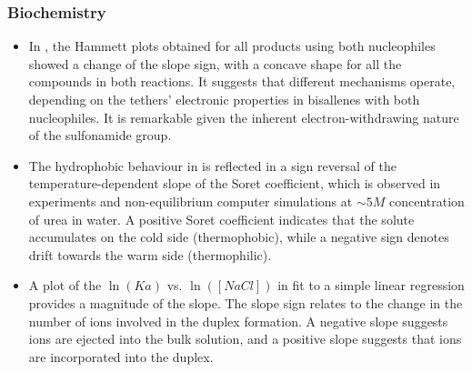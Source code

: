 \documentclass[11pt]{book}
\begin{document}
\subsubsection{Biochemistry}
\begin{itemize}
\item In \cite{quiros2017nucleophile},
the Hammett plots obtained for all products using both nucleophiles
showed a change of the slope sign, with a concave shape for all the
compounds in both reactions. It suggests that different mechanisms
operate, depending on the tethers' electronic properties in bisallenes
with both nucleophiles. It is remarkable given the inherent electron-withdrawing
nature of the sulfonamide group.
\item The hydrophobic behaviour in \cite{niether2018unravelling}
is reflected in a sign reversal of the temperature-dependent slope
of the Soret coefficient, which is observed in experiments and non-equilibrium
computer simulations at $\sim5M$ concentration of urea in water.
A positive Soret coefficient indicates that the solute accumulates
on the cold side (thermophobic), while a negative sign denotes drift
towards the warm side (thermophilic).
\item A plot of the $\ln\left(Ka\right)$ vs. $\ln\left(\left[NaCl\right]\right)$
in \cite{swenson2021evaluating}
fit to a simple linear regression provides a magnitude of the slope.
The slope sign relates to the change in the number of ions involved
in the duplex formation. A negative slope suggests ions are ejected
into the bulk solution, and a positive slope suggests that ions are
incorporated into the duplex.
\end{itemize}
\end{document}
